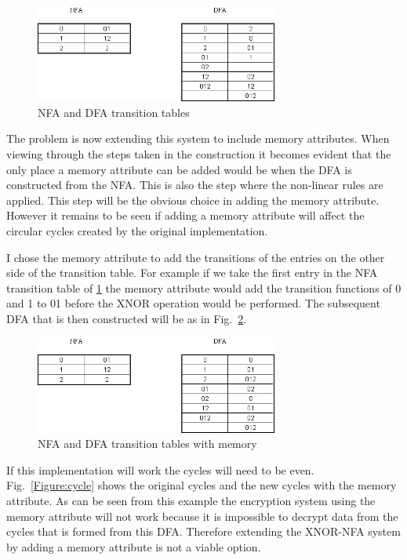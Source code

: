\documentclass[a4paper,11pt,titlepage]{article}
\begin{document}
\begin{figure}[htbp]
   \centering
   \includegraphics[width=8cm]{nfa.png}
   \caption{NFA and DFA transition tables}
   \label{Figure:nfa}
\end{figure}

The problem is now extending this system to include memory attributes. When viewing through the steps taken in the construction it becomes evident that the only place a memory attribute can be added would be when the DFA is constructed from the NFA. This is also the step where the non-linear rules are applied. This step will be the obvious choice in adding the memory attribute. However it remains to be seen if adding a memory attribute will affect the circular cycles created by the original implementation.

I chose the memory attribute to add the transitions of the entries on the other side of the transition table. For example if we take the first entry in the NFA transition table of \ref{Figure:nfa} the memory attribute would add the transition functions of 0 and 1 to 01 before the XNOR operation would be performed. The subsequent DFA that is then constructed will be as in Fig.~\ref{Figure:newnfa}.

\begin{figure}[htbp]
   \centering
   \includegraphics[width=8cm]{new.png}
   \caption{NFA and DFA transition tables with memory}
   \label{Figure:newnfa}
\end{figure}

If this implementation will work the cycles will need to be even. Fig.~\ref{Figure:cycle} shows the original cycles and the new cycles with the memory attribute. As can be seen from this example the encryption system using the memory attribute will not work because it is impossible to decrypt data from the cycles that is formed from this DFA. Therefore extending the XNOR-NFA system by adding a memory attribute is not a viable option.
\end{document}
